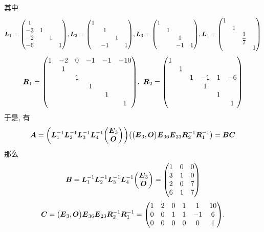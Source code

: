 \begin{solution}
\begin{enumerate}[label=(\arabic{*})]
              其中 $$\vb*{L}_1=\mqty(1\\-3&1\\-2&&1\\-6&&&1),\vb*{L}_2=\mqty(1\\&1\\&&1\\&-1&&1),\vb*{L}_3=\mqty(1\\&1\\&&1\\&&-1&1),\vb*{L}_4=\mqty(1\\&1\\&&\dfrac{1}{7}\\&&&1)$$
              $$\vb*{R}_1=\mqty(1&-2&0&-1&-1&-10\\&1\\&&1\\&&&1\\&&&&1\\&&&&&1),~\vb*{R}_2=\mqty(1\\&1\\&&1&-1&1&-6\\&&&1\\&&&&1\\&&&&&1)$$
              于是, 有 $$\vb*{A}=\qty(\vb*{L}_1^{-1}\vb*{L}_2^{-1}\vb*{L}_3^{-1}\vb*{L}_4^{-1}\mqty(\vb*{E}_3\\\vb*{O}))\qty(\mqty(\vb*{E}_3,\vb*{O})\vb*{E}_{36}\vb*{E}_{23}\vb*{R}_2^{-1}\vb*{R}_1^{-1})=\vb*{BC}$$
              那么 $$\vb*{B}=\vb*{L}_1^{-1}\vb*{L}_2^{-1}\vb*{L}_3^{-1}\vb*{L}_4^{-1}\mqty(\vb*{E}_3\\\vb*{O})=\mqty(1&0&0\\3&1&0\\2&0&7\\6&1&7)$$
              $$\vb*{C}=\mqty(\vb*{E}_3,\vb*{O})\vb*{E}_{36}\vb*{E}_{23}\vb*{R}_2^{-1}\vb*{R}_1^{-1}=\mqty(1&2&0&1&1&10\\0&0&1&1&-1&6\\0&0&0&0&0&1).$$
    \end{enumerate}
\end{solution}

